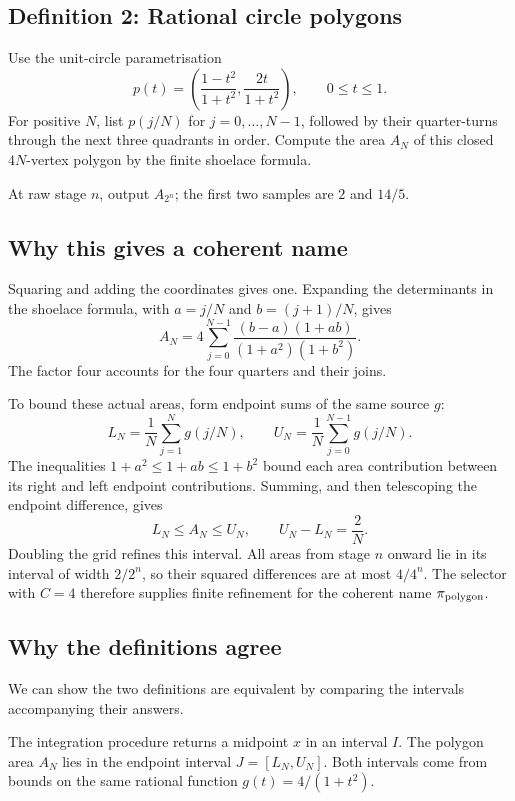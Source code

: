 \documentclass[11pt]{article}
\begin{document}
\subsection*{Definition 2: Rational circle polygons}

Use the unit-circle parametrisation
\[
 p(t)=\left(\frac{1-t^2}{1+t^2},\frac{2t}{1+t^2}\right),
                    \qquad0\leq t\leq1.
\]
For positive $N$, list $p(j/N)$ for $j=0,\ldots,N-1$, followed by their
quarter-turns through the next three quadrants in order. Compute the area
$A_N$ of this closed $4N$-vertex polygon by the finite shoelace formula.

At raw stage $n$, output $A_{2^n}$; the first two samples are $2$ and $14/5$.

\subsection*{Why this gives a coherent name}

Squaring and adding the coordinates gives one. Expanding the determinants
in the shoelace formula, with $a=j/N$ and $b=(j+1)/N$, gives
\[
            A_N=4\sum_{j=0}^{N-1}
            \frac{(b-a)(1+ab)}{(1+a^2)(1+b^2)}.
\]
The factor four accounts for the four quarters and their joins.

To bound these actual areas, form endpoint sums of the same source $g$:
\[
 L_N=\frac1N\sum_{j=1}^{N}g(j/N),\qquad
 U_N=\frac1N\sum_{j=0}^{N-1}g(j/N).
\]
The inequalities $1+a^2\leq1+ab\leq1+b^2$ bound each area contribution
between its right and left endpoint contributions. Summing, and then
telescoping the endpoint difference, gives
\[
                    L_N\leq A_N\leq U_N,
                \qquad U_N-L_N=\frac2N.
\]
Doubling the grid refines this interval. All areas from stage $n$ onward
lie in its interval of width $2/2^n$, so their squared differences are at
most $4/4^n$. The selector with $C=4$ therefore supplies finite refinement
for the coherent name $\pi_{\rm polygon}$.

\subsection*{Why the definitions agree}

We can show the two definitions are equivalent by comparing the intervals
accompanying their answers.

The integration procedure returns a midpoint $x$ in an interval $I$.
The polygon area $A_N$ lies in the endpoint interval $J=[L_N,U_N]$.
Both intervals come from bounds on the same rational function
$g(t)=4/(1+t^2)$.
\end{document}
